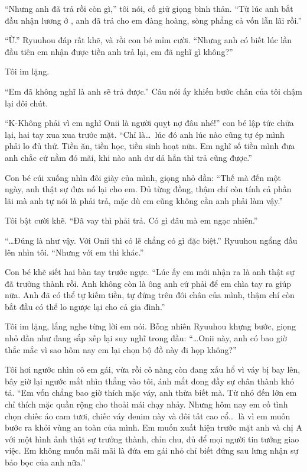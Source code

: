\documentclass[../main.tex]{subfiles}
\begin{document}
``Nhưng anh đã trả rồi còn gì,'' tôi nói, cố giữ giọng bình thản. ``Từ lúc anh bắt đầu nhận lương ở \hll, anh đã trả cho em đàng hoàng, sòng phẳng cả vốn lẫn lãi rồi.''

``Ừ.'' Ryuuhou đáp rất khẽ, và rồi con bé mỉm cười. ``Nhưng anh có biết lúc lần đầu tiên em nhận được tiền anh trả lại, em đã nghĩ gì không?''

Tôi im lặng.

``Em đã không nghĩ là anh sẽ trả được.'' Câu nói ấy khiến bước chân của tôi chậm lại đôi chút.

``K-Không phải vì em nghĩ Onii là người quỵt nợ đâu nhé!'' con bé lập tức chữa lại, hai tay xua xua trước mặt. ``Chỉ là\dots\ lúc đó anh lúc nào cũng tự ép mình phải lo đủ thứ. Tiền ăn, tiền học, tiền sinh hoạt nữa. Em nghĩ số tiền mình đưa anh chắc cứ nằm đó mãi, khi nào anh dư dả hẳn thì trả cũng được.''

Con bé cúi xuống nhìn đôi giày của mình, giọng nhỏ dần: ``Thế mà đến một ngày, anh thật sự đưa nó lại cho em. Đủ từng đồng, thậm chí còn tính cả phần lãi mà anh tự nói là phải trả, mặc dù em cũng không cần anh phải làm vậy.''

Tôi bật cười khẽ. ``Đã vay thì phải trả. Có gì đâu mà em ngạc nhiên.''

``\dots Đúng là như vậy. Với Onii thì có lẽ chẳng có gì đặc biệt.'' Ryuuhou ngẩng đầu lên nhìn tôi. ``Nhưng với em thì khác.''

Con bé khẽ siết hai bàn tay trước ngực. ``Lúc ấy em mới nhận ra là anh thật sự đã trưởng thành rồi. Anh không còn là ông anh cứ phải để em chìa tay ra giúp nữa. Anh đã có thể tự kiếm tiền, tự đứng trên đôi chân của mình, thậm chí còn bắt đầu có thể lo ngược lại cho cả gia đình.''

Tôi im lặng, lắng nghe từng lời em nói. Bỗng nhiên Ryuuhou khựng bước, giọng nhỏ dần như đang sắp xếp lại suy nghĩ trong đầu: ``\dots Onii này, anh có bao giờ thắc mắc vì sao hôm nay em lại chọn bộ đồ này đi họp không?''

Tôi hơi ngước nhìn cô em gái, vừa rồi cô nàng còn đang xấu hổ vì váy bị bay lên, bây giờ lại ngước mắt nhìn thẳng vào tôi, ánh mắt đong đầy sự chân thành khó tả. ``Em vốn chẳng bao giờ thích mặc váy, anh thừa biết mà. Từ nhỏ đến lớn em chỉ thích mặc quần rộng cho thoải mái chạy nhảy. Nhưng hôm nay em cố tình chọn chiếc áo cam tươi, chiếc váy denim này và đôi tất cao cổ\dots\ là vì em muốn bước ra khỏi vùng an toàn của mình. Em muốn xuất hiện trước mặt anh và chị A với một hình ảnh thật sự trưởng thành, chỉn chu, đủ để mọi người tin tưởng giao việc. Em không muốn mãi mãi là đứa em gái nhỏ chỉ biết đứng sau lưng nhận sự bảo bọc của anh nữa.''
\end{document}
